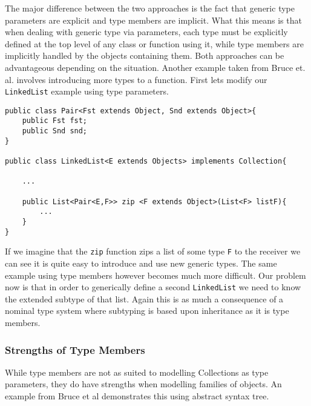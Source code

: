 \documentclass[11pt
              , a4paper
              , twoside
              , openright
              ]{report}
\numberwithin{case}{theorem}
\numberwithin{subcase}{case}
\begin{document}
The major difference between the two approaches is the fact that generic type parameters are explicit and type members are implicit. What this means is that when dealing with generic type via parameters, each type must be explicitly defined at the top level of any class or function using it, while type members are implicitly handled by the objects containing them. Both approaches can be advantageous depending on the situation. Another example taken from Bruce et. al. \cite{Bruce:1998:SSA:646155.679691} involves introducing more types to a function. First lets modify our \verb|LinkedList| example using type parameters.
\begin{lstlisting}[mathescape, style=custom_lang]
public class Pair<Fst extends Object, Snd extends Object>{
	public Fst fst;
	public Snd snd;
}

public class LinkedList<E extends Objects> implements Collection{

	...
	
	public List<Pair<E,F>> zip <F extends Object>(List<F> listF){
		...
	}	
}
\end{lstlisting}
If we imagine that the \verb|zip| function zips a list of some type \verb|F| to the receiver we can see it is quite easy to introduce and use new generic types. The same example using type members however becomes much more difficult. Our problem now is that in order to generically define a second \verb|LinkedList| we need to know the extended subtype of that list. Again this is as much a consequence of a nominal type system where subtyping is based upon inheritance as it is type members. 

\subsubsection{Strengths of Type Members}

While type members are not as suited to modelling Collections as type parameters, they do have strengths when modelling families of objects. An example from Bruce et al \cite{Bruce:1998:SSA:646155.679691} demonstrates this using abstract syntax tree. 
\end{document}
